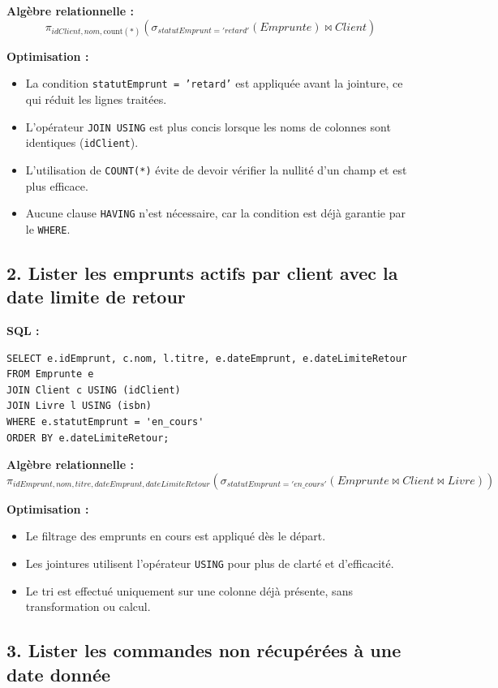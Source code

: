 \documentclass{article}
\begin{document}
\textbf{Algèbre relationnelle :}
\[
\pi_{idClient, nom, \text{count}(*)} \left(
  \sigma_{statutEmprunt = 'retard'}(Emprunte) \bowtie Client
\right)
\]

\textbf{Optimisation :}
\begin{itemize}
  \item La condition \texttt{statutEmprunt = 'retard'} est appliquée avant la jointure, ce qui réduit les lignes traitées.
  \item L’opérateur \texttt{JOIN USING} est plus concis lorsque les noms de colonnes sont identiques (\texttt{idClient}).
  \item L’utilisation de \texttt{COUNT(*)} évite de devoir vérifier la nullité d’un champ et est plus efficace.
  \item Aucune clause \texttt{HAVING} n’est nécessaire, car la condition est déjà garantie par le \texttt{WHERE}.
\end{itemize}

\bigskip

\subsection*{2. Lister les emprunts actifs par client avec la date limite de retour}

\textbf{SQL :}
\begin{lstlisting}
SELECT e.idEmprunt, c.nom, l.titre, e.dateEmprunt, e.dateLimiteRetour
FROM Emprunte e
JOIN Client c USING (idClient)
JOIN Livre l USING (isbn)
WHERE e.statutEmprunt = 'en_cours'
ORDER BY e.dateLimiteRetour;
\end{lstlisting}

\textbf{Algèbre relationnelle :}
\[
\pi_{idEmprunt, nom, titre, dateEmprunt, dateLimiteRetour} \left(
  \sigma_{statutEmprunt = 'en\_cours'}(Emprunte \bowtie Client \bowtie Livre)
\right)
\]

\textbf{Optimisation :}
\begin{itemize}
  \item Le filtrage des emprunts en cours est appliqué dès le départ.
  \item Les jointures utilisent l’opérateur \texttt{USING} pour plus de clarté et d’efficacité.
  \item Le tri est effectué uniquement sur une colonne déjà présente, sans transformation ou calcul.
\end{itemize}

\bigskip

\subsection*{3. Lister les commandes non récupérées à une date donnée}
\end{document}
